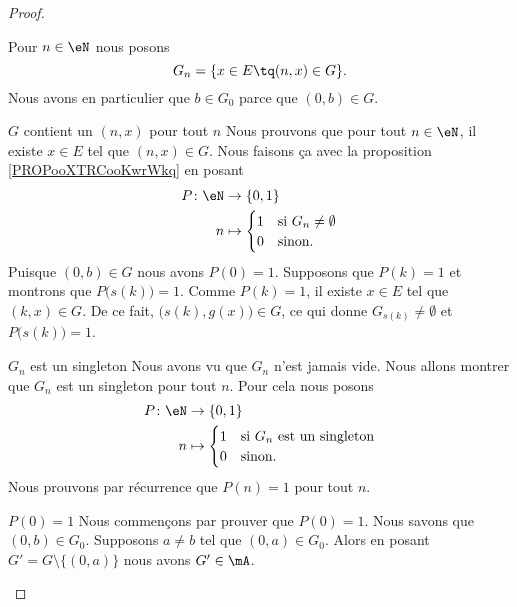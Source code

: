 \begin{proof}
\begin{subproof}
    Pour \( n\in \eN\) nous posons
    \begin{equation}
        G_n=\{ x\in E\tq (n,x)\in G \}.
    \end{equation}
    Nous avons en particulier que \( b\in G_0\) parce que \( (0,b)\in G\).
\item[\( G\) contient un \( (n,x)\) pour tout \( n\)]
    Nous prouvons que pour tout \( n\in \eN\), il existe \( x\in E\) tel que \( (n,x)\in G\). Nous faisons ça avec la proposition \ref{PROPooXTRCooKwrWkq} en posant
    \begin{equation}
        \begin{aligned}
            P\colon \eN&\to \{ 0,1 \} \\
            n&\mapsto \begin{cases}
                1    &   \text{si } G_n\neq\emptyset \\
                0    &    \text{sinon.}
            \end{cases}
        \end{aligned}
    \end{equation}
    Puisque \( (0,b)\in G\) nous avons \( P(0)=1\). Supposons que \( P(k)=1\) et montrons que \( P\big( s(k) \big)=1\). Comme \( P(k)=1\), il existe \( x\in E\) tel que \( (k,x)\in G\). De ce fait, \( \big( s(k),g(x) \big)\in G\), ce qui donne \( G_{s(k)}\neq \emptyset\) et \( P\big( s(k) \big)=1\).
\item[\( G_n\) est un singleton]
    Nous avons vu que \( G_n\) n'est jamais vide. Nous allons montrer que \( G_n\) est un singleton pour tout \( n\). Pour cela nous posons
    \begin{equation}
        \begin{aligned}
            P\colon \eN&\to \{ 0,1 \} \\
            n&\mapsto \begin{cases}
                1    &   \text{si }  G_n \text{ est un singleton}\\
                0    &    \text{sinon. }
            \end{cases}
        \end{aligned}
    \end{equation}
    Nous prouvons par récurrence que \( P(n)=1\) pour tout \( n\).
    \begin{subproof}
    \item[\( P(0)=1\)]
    Nous commençons par prouver que \( P(0)=1\). Nous savons que \( (0,b)\in G_0\). Supposons \( a\neq b\) tel que \( (0,a)\in G_0\). Alors en posant \( G'=G\setminus\{ (0,a) \}\) nous avons \( G'\in \mA\).


\end{subproof}
\end{subproof}
\end{proof}
